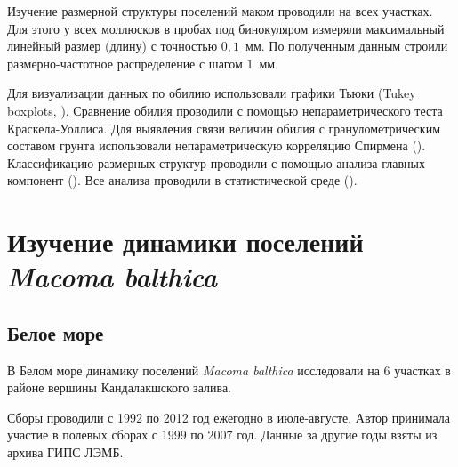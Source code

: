 Изучение размерной структуры поселений маком проводили на всех участках.
Для этого у всех моллюсков в пробах под бинокуляром измеряли максимальный линейный размер (длину) с точностью $0,1$~мм.
По полученным данным строили размерно-частотное распределение с шагом $1$~мм.


Для визуализации данных по обилию использовали графики Тьюки (Tukey boxplots, \cite{Tukey_1977}). 
Сравнение обилия проводили с помощью непараметрического теста Краскела-Уоллиса. 
Для выявления связи величин обилия с гранулометрическим составом грунта использовали непараметрическую корреляцию Спирмена (\cite{Hollander_et_al_2013}).
Классификацию размерных структур проводили с помощью анализа главных компонент (\cite{Mardia_et_al_1979}).
Все анализа проводили в статистической среде \R{} (\cite{R_2014}).

\afterpage{\clearpage}

	\section{Изучение динамики поселений {\it Macoma balthica}}
        \subsection{Белое море}
В Белом море динамику поселений {\it Macoma balthica} исследовали на $6$ участках в районе вершины Кандалакшского залива. 

Сборы проводили с 1992 по 2012 год ежегодно в июле-августе.
Автор принимала участие в полевых сборах с $1999$ по $2007$ год.
Данные за другие годы взяты из архива ГИПС ЛЭМБ.

